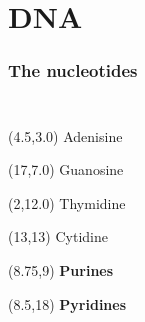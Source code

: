 \documentclass[10pt, xcolor=x11names, compress]{beamer}
\begin{document}
\section{DNA}


\begin{frame}
  \frametitle{The nucleotides}
  \begin{columns}[T]
    \begin{column}{0.5\linewidth}
      {\tiny
        }
    \end{column}
    \begin{column}{0.5\linewidth}
      {\tiny 
        }
    \end{column}
  \end{columns}

  \bigskip

  \begin{columns}[T]
    \begin{column}{0.5\linewidth}
      {\tiny
        
      }     
    \end{column}
    \begin{column}{0.5\linewidth}
      {\tiny
        
      }      
    \end{column}
  \end{columns}

  \begin{textblock*}{0.2\linewidth}(4.5\TPHorizModule,3.0\TPVertModule)%
    Adenisine
  \end{textblock*}
  \begin{textblock*}{0.2\linewidth}(17\TPHorizModule,7.0\TPVertModule)%
    Guanosine
  \end{textblock*}
  \begin{textblock*}{0.2\linewidth}(2\TPHorizModule,12.0\TPVertModule)%
    Thymidine
  \end{textblock*}
  \begin{textblock*}{0.2\linewidth}(13\TPHorizModule,13\TPVertModule)%
    Cytidine
  \end{textblock*}
  \begin{textblock*}{0.2\linewidth}(8.75\TPHorizModule,9\TPVertModule)%
    \textbf{Purines}
  \end{textblock*}
  \begin{textblock*}{0.2\linewidth}(8.5\TPHorizModule,18\TPVertModule)%
    \textbf{Pyridines}
  \end{textblock*}
  
\end{frame}
\end{document}
